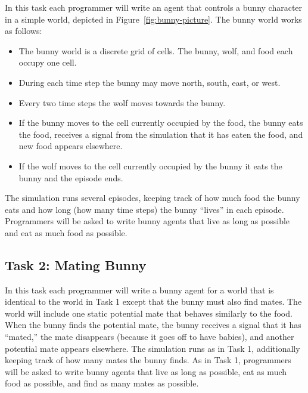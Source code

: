 In this task each programmer will write an agent that controls a bunny character in a simple
world, depicted in Figure~\ref{fig:bunny-picture}.  The bunny world works as follows:

\begin{itemize}

\item The bunny world is a discrete grid of cells.  The bunny, wolf, and food each occupy one cell.

\item During each time step the bunny may move north, south, east, or west.

\item Every two time steps the wolf moves towards the bunny.

\item If the bunny moves to the cell currently occupied by the food, the bunny eats the food, receives a signal from the simulation that it has eaten the food, and new food appears elsewhere.

\item If the wolf moves to the cell currently occupied by the bunny it eats the bunny and the episode ends.

\end{itemize}

The simulation runs several episodes, keeping track of how much food the bunny eats and how long (how many time steps) the bunny ``lives'' in each episode.  Programmers will be asked to write bunny agents that live as long as possible and eat as much food as possible.

\subsection{Task 2: Mating Bunny}\label{sec:task2}

In this task each programmer will write a bunny agent for a world that is identical to the world in Task 1 except that the bunny must also find mates.  The world will include one static  potential mate that behaves similarly to the food.  When the bunny finds the potential mate, the bunny receives a signal that it has ``mated,'' the mate disappears (because it goes off to have babies), and another potential mate appears elsewhere.  The simulation runs as in Task 1, additionally keeping track of how many mates the bunny finds.  As in Task 1, programmers will be asked to write bunny agents that live as long as possible, eat as much food as possible, and find as many mates as possible.

